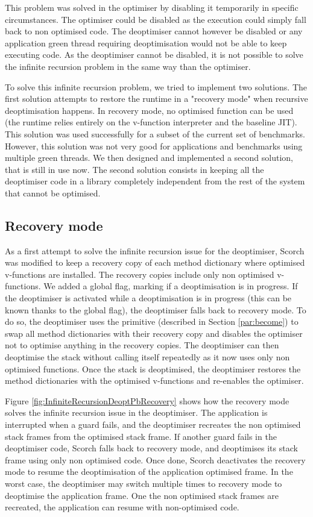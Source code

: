 \documentclass[a4paper,12pt,twoside]{../includes/ThesisStyle}
\begin{document}
This problem was solved in the optimiser by disabling it temporarily in specific circumstances. The optimiser could be disabled as the execution could simply fall back to non optimised code. The deoptimiser cannot however be disabled or any application green thread requiring deoptimisation would not be able to keep executing code. As the deoptimiser cannot be disabled, it is not possible to solve the infinite recursion problem in the same way than the optimiser. 

To solve this infinite recursion problem, we tried to implement two solutions. The first solution attempts to restore the runtime in a "recovery mode" when recursive deoptimisation happens. In recovery mode, no optimised function can be used (the runtime relies entirely on the v-function interpreter and the baseline JIT). This solution was used successfully for a subset of the current set of benchmarks. However, this solution was not very good for applications and benchmarks using multiple green threads. We then designed and implemented a second solution, that is still in use now. The second solution consists in keeping all the deoptimiser code in a library completely independent from the rest of the system that cannot be optimised.

\subsection{Recovery mode}

As a first attempt to solve the infinite recursion issue for the deoptimiser, Scorch was modified to keep a recovery copy of each method dictionary where optimised v-functions are installed. The recovery copies include only non optimised v-functions. We added a global flag, marking if a deoptimisation is in progress. If the deoptimiser is activated while a deoptimisation is in progress (this can be known thanks to the global flag), the deoptimiser falls back to recovery mode. To do so, the deoptimiser uses the primitive  (described in Section \ref{par:become}) to swap all method dictionaries with their recovery copy and disables the optimiser not to optimise anything in the recovery copies. The deoptimiser can then deoptimise the stack without calling itself repeatedly as it now uses only non optimised functions. Once the stack is deoptimised, the deoptimiser restores the method dictionaries with the optimised v-functions and re-enables the optimiser. 

Figure \ref{fig:InfiniteRecursionDeoptPbRecovery} shows how the recovery mode solves the infinite recursion issue in the deoptimiser. The application is interrupted when a guard fails, and the deoptimiser recreates the non optimised stack frames from the optimised stack frame. If another guard fails in the deoptimiser code, Scorch falls back to recovery mode, and deoptimises its stack frame using only non optimised code. Once done, Scorch deactivates the recovery mode to resume the deoptimisation of the application optimised frame. In the worst case, the deoptimiser may switch multiple times to recovery mode to deoptimise the application frame. One the non optimised stack frames are recreated, the application can resume with non-optimised code.
\end{document}
